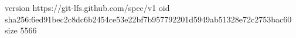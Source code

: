 version https://git-lfs.github.com/spec/v1
oid sha256:6ed91bec2c8dc6b2454ce53e22bf7b957792201d5949ab51328e72c2753bac60
size 5566
